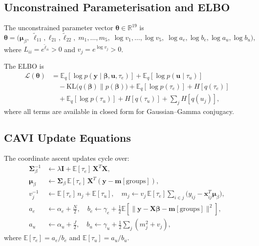 \documentclass[11pt,a4paper]{article}
\newcommand{\E}{\mathbb{E}}
\newcommand{\R}{\mathbb{R}}
\begin{document}
\subsection{Unconstrained Parameterisation and ELBO}

The unconstrained parameter vector $\bm{\theta} \in \R^{19}$ is
\begin{equation}
  \bm{\theta} = \bigl(\bm{\mu}_\beta,\;
    \tilde{\ell}_{11}, \ell_{21}, \tilde{\ell}_{22},\;
    m_1,\ldots,m_5,\;
    \log v_1,\ldots,\log v_5,\;
    \log a_e, \log b_e, \log a_u, \log b_u
  \bigr),
\end{equation}
where $L_{ii} = e^{\tilde{\ell}_{ii}} > 0$ and $v_j = e^{\log v_j} > 0$.

The ELBO is
\begin{align}
  \mathcal{L}(\bm{\theta})
  &= \E_q\!\left[\log p(\mathbf{y}\mid\bm{\beta},\mathbf{u},\tau_e)\right]
    + \E_q\!\left[\log p(\mathbf{u}\mid\tau_u)\right]
    \nonumber\\
  &\quad - \mathrm{KL}\bigl(q(\bm{\beta})\|p(\bm{\beta})\bigr)
    + \E_q\!\left[\log p(\tau_e)\right] + H[q(\tau_e)]
    \nonumber\\
  &\quad + \E_q\!\left[\log p(\tau_u)\right] + H[q(\tau_u)]
    + \sum_j H[q(u_j)],
\end{align}
where all terms are available in closed form for Gaussian--Gamma conjugacy.

\subsection{CAVI Update Equations}

The coordinate ascent updates cycle over:
\begin{align}
  \bm{\Sigma}_\beta^{-1} &\leftarrow \lambda\bm{I} + \E[\tau_e]\,\bm{X}^T\bm{X}, \label{eq:cavi_beta_cov}\\
  \bm{\mu}_\beta &\leftarrow \bm{\Sigma}_\beta\,\E[\tau_e]\,\bm{X}^T(\mathbf{y} - \bm{m}[\mathrm{groups}]),\\
  v_j^{-1} &\leftarrow \E[\tau_e]\,n_j + \E[\tau_u], \quad
  m_j \leftarrow v_j\,\E[\tau_e]\!\sum_{i\in j}\!\bigl(y_{ij} - \mathbf{x}_{ij}^T\bm{\mu}_\beta\bigr),\\
  a_e &\leftarrow \alpha_e + \tfrac{N}{2}, \quad
  b_e \leftarrow \gamma_e + \tfrac{1}{2}\E\!\left[\|\mathbf{y} - \bm{X}\bm{\beta} - \bm{m}[\mathrm{groups}]\|^2\right],\\
  a_u &\leftarrow \alpha_u + \tfrac{J}{2}, \quad
  b_u \leftarrow \gamma_u + \tfrac{1}{2}\sum_j\!(m_j^2 + v_j),
\end{align}
where $\E[\tau_e] = a_e/b_e$ and $\E[\tau_u] = a_u/b_u$.
\end{document}

